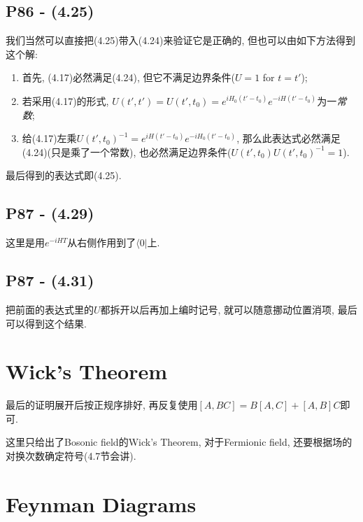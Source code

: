 \documentclass[10pt,b5paper,openany]{book}
\begin{document}
\begin{center}
\end{center}

\subsection{P86 - (4.25)}

我们当然可以直接把(4.25)带入(4.24)来验证它是正确的, 但也可以由如下方法得到这个解: 
\begin{enumerate}
  \item 首先, (4.17)必然满足(4.24), 但它不满足边界条件($U = 1$ for $t = t'$); 
  \item 若采用(4.17)的形式, $U(t', t') = U(t', t_0) = e^{iH_0(t'-t_0)}e^{-iH(t'-t_0)}$为一\textit{常数}; 
  \item 给(4.17)左乘$U(t', t_0)^{-1} = e^{iH(t'-t_0)}e^{-iH_0(t'-t_0)}$, 那么此表达式必然满足(4.24)(只是乘了一个常数), 也必然满足边界条件($U(t', t_0)U(t', t_0)^{-1} = 1$). 
\end{enumerate}
最后得到的表达式即(4.25). 

\subsection{P87 - (4.29)}

这里是用$e^{-iHT}$从右侧作用到了$\langle 0|$上. 

\subsection{P87 - (4.31)}

把前面的表达式里的$U$都拆开以后再加上编时记号, 就可以随意挪动位置消项, 最后可以得到这个结果. 

\section{Wick's Theorem}

最后的证明展开后按正规序排好, 再反复使用$[A, BC] = B[A, C] + [A, B]C$即可. 

这里只给出了Bosonic field的Wick's Theorem, 对于Fermionic field, 还要根据场的对换次数确定符号(4.7节会讲). 

\section{Feynman Diagrams}
\end{document}
